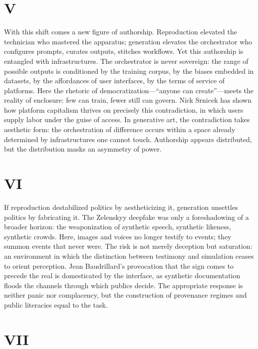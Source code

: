 \documentclass[12pt]{article}
\begin{document}
\section*{V}

With this shift comes a new figure of authorship. Reproduction elevated the technician who mastered the apparatus; generation elevates the orchestrator who configures prompts, curates outputs, stitches workflows. Yet this authorship is entangled with infrastructures. The orchestrator is never sovereign: the range of possible outputs is conditioned by the training corpus, by the biases embedded in datasets, by the affordances of user interfaces, by the terms of service of platforms. Here the rhetoric of democratization—“anyone can create”—meets the reality of enclosure: few can train, fewer still can govern. Nick Srnicek has shown how platform capitalism thrives on precisely this contradiction, in which users supply labor under the guise of access.\autocite{Srnicek2016} In generative art, the contradiction takes aesthetic form: the orchestration of difference occurs within a space already determined by infrastructures one cannot touch. Authorship appears distributed, but the distribution masks an asymmetry of power.

\section*{VI}

If reproduction destabilized politics by aestheticizing it, generation unsettles politics by fabricating it. The Zelenskyy deepfake was only a foreshadowing of a broader horizon: the weaponization of synthetic speech, synthetic likeness, synthetic crowds. Here, images and voices no longer testify to events; they summon events that never were. The risk is not merely deception but saturation: an environment in which the distinction between testimony and simulation ceases to orient perception. Jean Baudrillard’s provocation that the sign comes to precede the real is domesticated by the interface,\autocite{Baudrillard1994} as synthetic documentation floods the channels through which publics decide. The appropriate response is neither panic nor complacency, but the construction of provenance regimes and public literacies equal to the task.

\section*{VII}
\end{document}
